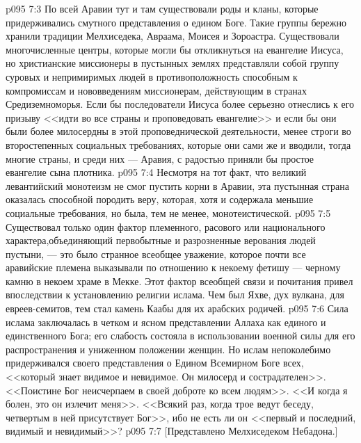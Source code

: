 \vs p095 7:3 По всей Аравии тут и там существовали роды и кланы, которые придерживались смутного представления о едином Боге. Такие группы бережно хранили традиции Мелхиседека, Авраама, Моисея и Зороастра. Существовали многочисленные центры, которые могли бы откликнуться на евангелие Иисуса, но христианские миссионеры в пустынных землях представляли собой группу суровых и непримиримых людей в противоположность способным к компромиссам и нововведениям миссионерам, действующим в странах Средиземноморья. Если бы последователи Иисуса более серьезно отнеслись к его призыву <<идти во все страны и проповедовать евангелие>> и если бы они были более милосердны в этой проповеднической деятельности, менее строги во второстепенных социальных требованиях, которые они сами же и вводили, тогда многие страны, и среди них --- Аравия, с радостью приняли бы простое евангелие сына плотника.
\vs p095 7:4 Несмотря на тот факт, что великий левантийский монотеизм не смог пустить корни в Аравии, эта пустынная страна оказалась способной породить веру, которая, хотя и содержала меньшие социальные требования, но была, тем не менее, монотеистической.
\vs p095 7:5 Существовал только один фактор племенного, расового или национального характера,объединяющий первобытные и разрозненные верования людей пустыни, --- это было странное всеобщее уважение, которое почти все аравийские племена выказывали по отношению к некоему фетишу --- черному камню в некоем храме в Мекке. Этот фактор всеобщей связи и почитания привел впоследствии к установлению религии ислама. Чем был Яхве, дух вулкана, для евреев\hyp{}семитов, тем стал камень Каабы для их арабских родичей.
\vs p095 7:6 Сила ислама заключалась в четком и ясном представлении Аллаха как единого и единственного Бога; его слабость состояла в использовании военной силы для его распространения и униженном положении женщин. Но ислам непоколебимо придерживался своего представления о Едином Всемирном Боге всех, <<который знает видимое и невидимое. Он милосерд и сострадателен>>. <<Поистине Бог неисчерпаем в своей доброте ко всем людям>>. <<И когда я болен, это он излечит меня>>. <<Всякий раз, когда трое ведут беседу, четвертым в ней присутствует Бог>>, ибо не есть ли он <<первый и последний, видимый и невидимый>>?
\vs p095 7:7 [Представлено Мелхиседеком Небадона.]
